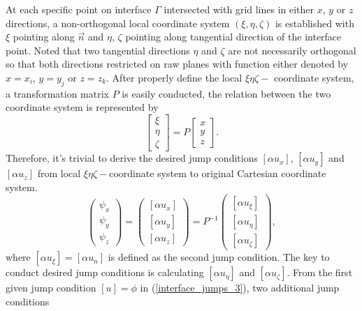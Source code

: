 \documentclass[dissertation]{uathesis}
\begin{document}
\begin{body}
\begin{flushleft}
\hspace{1cm} At each specific point on interface $\Gamma$ intersected with grid lines in either $x$, $y$ or $z$ directions, a non-orthogonal local coordinate system $(\xi,\eta,\zeta)$ is established with $\xi$ pointing along $\vec{n}$ and $\eta$, $\zeta$ pointing along tangential direction of the interface point. Noted that two tangential directions $\eta$ and $\zeta$ are not necessarily orthogonal so that both directions restricted on raw planes with function either denoted by $x = x_i$, $y = y_j$ or $z = z_k$. After properly define the local $\xi\eta\zeta-$ coordinate system, a transformation matrix $P$ is easily conducted, the relation between the two coordinate system is represented by
%
\begin{equation}\label{orginal-to-local_3}
\begin{bmatrix}
\xi \\
\eta \\
\zeta 
\end{bmatrix}
=
P
\begin{bmatrix}
x \\
y \\
z
\end{bmatrix}.
\end{equation}
%
Therefore, it's trivial to derive the desired jump conditions $[\alpha u_{x}]$, $[\alpha u_{y}]$ and $[\alpha u_{z}]$ from local $\xi\eta\zeta-$coordinate system to original Cartesian coordinate system.
%
\begin{equation} \label{local-to-orginal_3}
\begin{pmatrix}
\psi_{x}    \\
\psi_{y}    \\
\psi_{z}
\end{pmatrix}
=
\begin{pmatrix}
[\alpha u_{x}]   \\
[\alpha u_{y}]   \\
[\alpha u_{z}]
\end{pmatrix}
=
P^{-1}
\begin{pmatrix}
[\alpha u_{\xi}]    \\
[\alpha u_{\eta}]   \\
[\alpha u_{\zeta}]
\end{pmatrix},
\end{equation}
%
where $[\alpha u_{\xi}] = [\alpha u_{n}]$ is defined as the second jump condition. The key to conduct desired jump conditions is calculating $[\alpha u_{\eta}]$ and $[\alpha u_{\zeta}]$. From the first given jump condition $[u]=\phi$ in (\ref{interface_jumps_3}), two additional jump conditions 

\end{flushleft}
\end{body}
\end{document}
